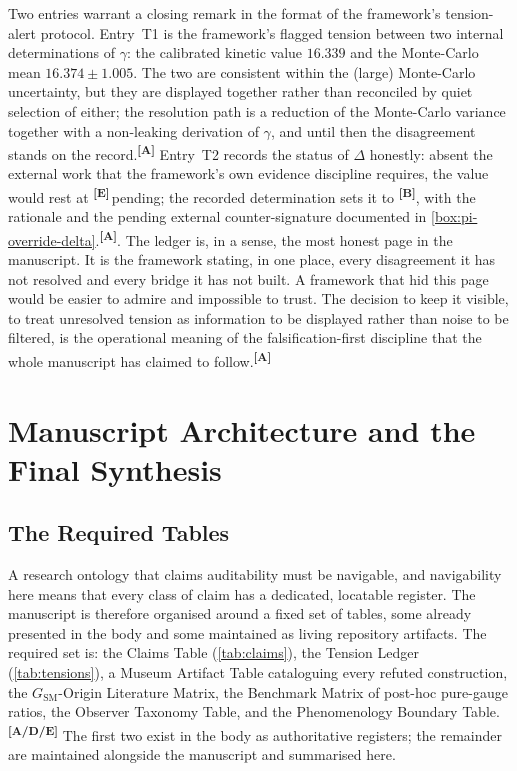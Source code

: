 \documentclass[12pt,a4paper,twoside]{article}
\theoremstyle{plain}
\theoremstyle{definition}
\theoremstyle{remark}
\newcommand{\catmark}[1]{\textsuperscript{\textsf{\textbf{[#1]}}}}
\begin{document}
\noindent Two entries warrant a closing remark in the format of the framework's tension-alert protocol. Entry~T1 is the framework's flagged tension between two internal determinations of $\gamma$: the calibrated kinetic value $16.339$ and the Monte-Carlo mean $16.374 \pm 1.005$. The two are consistent within the (large) Monte-Carlo uncertainty, but they are displayed together rather than reconciled by quiet selection of either; the resolution path is a reduction of the Monte-Carlo variance together with a non-leaking derivation of $\gamma$, and until then the disagreement stands on the record.\catmark{A} Entry~T2 records the status of $\Delta$ honestly: absent the external work that the framework's own evidence discipline requires, the value would rest at \catmark{E}\,pending; the recorded determination sets it to \catmark{B}, with the rationale and the pending external counter-signature documented in \cref{box:pi-override-delta}.\catmark{A}. The ledger is, in a sense, the most honest page in the manuscript. It is the framework stating, in one place, every disagreement it has not resolved and every bridge it has not built. A framework that hid this page would be easier to admire and impossible to trust. The decision to keep it visible, to treat unresolved tension as information to be displayed rather than noise to be filtered, is the operational meaning of the falsification-first discipline that the whole manuscript has claimed to follow.\catmark{A}

\section{Manuscript Architecture and the Final Synthesis}
\label{sec:final-synthesis}

\subsection{The Required Tables}
\label{subsec:required-tables}

A research ontology that claims auditability must be navigable, and navigability here means that every class of claim has a dedicated, locatable register. The manuscript is therefore organised around a fixed set of tables, some already presented in the body and some maintained as living repository artifacts. The required set is: the Claims Table (\cref{tab:claims}), the Tension Ledger (\cref{tab:tensions}), a Museum Artifact Table cataloguing every refuted construction, the $G_{\mathrm{SM}}$-Origin Literature Matrix, the Benchmark Matrix of post-hoc pure-gauge ratios, the Observer Taxonomy Table, and the Phenomenology Boundary Table.\catmark{A/D/E} The first two exist in the body as authoritative registers; the remainder are maintained alongside the manuscript and summarised here.
\end{document}
